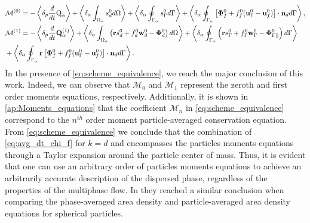 \begin{align}
    &\mathcal{M}^{(0)}
    = 
    - \left<\delta_p \frac{d}{dt} {\text Q_\alpha}\right>
    + \left<\delta_\alpha \int_{\Omega_{\alpha}}  s_d^0  d\Omega\right>
    + \left<\delta_\alpha \oint_{\Gamma_{\alpha}}  s_\Gamma ^0  d\Gamma\right>
    + \left<\delta_\alpha \oint_{\Gamma_{\alpha}}  
    \left[\mathbf{\Phi}_f^0 
    + f_f^0 (\textbf{u}_\Gamma ^0-\textbf{u}_f^0) \right] \cdot \textbf{n}_d  d\Gamma\right>,\\
    &\mathcal{M}^{(1)} =
    -  \left<\delta_p \frac{d}{dt} {\textbf{Q}_\alpha^{(1)}}\right>
     + \left<\delta_\alpha \int_{\Omega_{\alpha}}  \left(
        \textbf{r} s_d^0         
        + f_d^0  \textbf{w}_d^0 
        - \mathbf{\Phi}_d^0
    \right)  d\Omega\right>
    + \left<\delta_\alpha \oint_{\Gamma_{\alpha}}  \left(
        \textbf{r}s_\Gamma ^0
        + f_\Gamma ^0 \textbf{w}_\Gamma ^0
        - \mathbf{\Phi}_{\Gamma||}^0
    \right)  d\Gamma\right> \nonumber\\
    &+ \left<\delta_\alpha \oint_{\Gamma_{\alpha}}  \textbf{r} \left[
        \mathbf{\Phi}_f^0
        + f_f^0 (\textbf{u}_\Gamma ^0-\textbf{u}_f^0)
    \right]\cdot \textbf{n}_d   d\Gamma\right>.
\end{align}
In the presence of \ref{eq:scheme_equivalence}, we reach the major conclusion of this work. 
Indeed, we can observe that $\mathcal{M}_0$ and $\mathcal{M}_1$ represent the zeroth and first order moments equations, respectively. 
Additionally, it is shown in \ref{ap:Moments_equations} that the coefficient $\mathcal{M}_n$ in \ref{eq:scheme_equivalence} correspond to the $n^{th}$ order moment particle-averaged conservation equation. 
From \ref{eq:scheme_equivalence} we conclude that the combination of \ref{eq:avg_dt_chi_f} for $k=d$ and  encompasses the particles moments equations through a Taylor expansion around the particle center of mass. 
Thus, it is evident that one can use an arbitrary order of particles moments equations to achieve an arbitrarily accurate description of the dispersed phase, regardless of the properties of the multiphase flow.
In \cite{lhuillier2000bilan} they reached a similar conclusion when comparing the phase-averaged area density and particle-averaged area density equations for spherical particles. 

